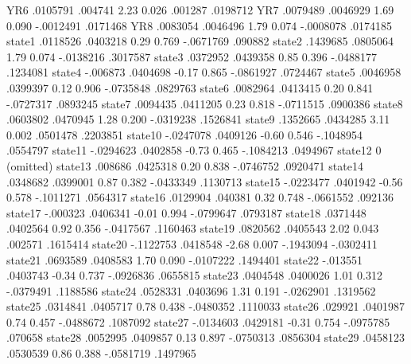          YR6 {\VBAR}   .0105791    .004741     2.23   0.026      .001287    .0198712
         YR7 {\VBAR}   .0079489   .0046929     1.69   0.090    -.0012491    .0171468
         YR8 {\VBAR}   .0083054   .0046496     1.79   0.074    -.0008078    .0174185
      state1 {\VBAR}   .0118526   .0403218     0.29   0.769    -.0671769     .090882
      state2 {\VBAR}   .1439685   .0805064     1.79   0.074    -.0138216    .3017587
      state3 {\VBAR}   .0372952   .0439358     0.85   0.396    -.0488177    .1234081
      state4 {\VBAR}   -.006873   .0404698    -0.17   0.865    -.0861927    .0724467
      state5 {\VBAR}   .0046958   .0399397     0.12   0.906    -.0735848    .0829763
      state6 {\VBAR}   .0082964   .0413415     0.20   0.841    -.0727317    .0893245
      state7 {\VBAR}   .0094435   .0411205     0.23   0.818    -.0711515    .0900386
      state8 {\VBAR}   .0603802   .0470945     1.28   0.200    -.0319238    .1526841
      state9 {\VBAR}   .1352665   .0434285     3.11   0.002     .0501478    .2203851
     state10 {\VBAR}  -.0247078   .0409126    -0.60   0.546    -.1048954    .0554797
     state11 {\VBAR}  -.0294623   .0402858    -0.73   0.465    -.1084213    .0494967
     state12 {\VBAR}          0  (omitted)
     state13 {\VBAR}    .008686   .0425318     0.20   0.838    -.0746752    .0920471
     state14 {\VBAR}   .0348682   .0399001     0.87   0.382    -.0433349    .1130713
     state15 {\VBAR}  -.0223477   .0401942    -0.56   0.578    -.1011271    .0564317
     state16 {\VBAR}   .0129904    .040381     0.32   0.748    -.0661552     .092136
     state17 {\VBAR}   -.000323   .0406341    -0.01   0.994    -.0799647    .0793187
     state18 {\VBAR}   .0371448   .0402564     0.92   0.356    -.0417567    .1160463
     state19 {\VBAR}   .0820562   .0405543     2.02   0.043      .002571    .1615414
     state20 {\VBAR}  -.1122753   .0418548    -2.68   0.007    -.1943094   -.0302411
     state21 {\VBAR}   .0693589   .0408583     1.70   0.090    -.0107222    .1494401
     state22 {\VBAR}   -.013551   .0403743    -0.34   0.737    -.0926836    .0655815
     state23 {\VBAR}   .0404548   .0400026     1.01   0.312    -.0379491    .1188586
     state24 {\VBAR}   .0528331   .0403696     1.31   0.191    -.0262901    .1319562
     state25 {\VBAR}   .0314841   .0405717     0.78   0.438    -.0480352    .1110033
     state26 {\VBAR}    .029921   .0401987     0.74   0.457    -.0488672    .1087092
     state27 {\VBAR}  -.0134603   .0429181    -0.31   0.754    -.0975785     .070658
     state28 {\VBAR}   .0052995   .0409857     0.13   0.897    -.0750313    .0856304
     state29 {\VBAR}   .0458123   .0530539     0.86   0.388    -.0581719    .1497965
